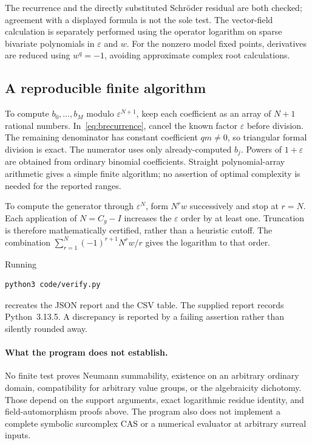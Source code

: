 \documentclass[11pt,a4paper]{article}
\numberwithin{equation}{section}
\theoremstyle{definition}
\theoremstyle{remark}
\newcommand{\eps}{\varepsilon}
\begin{document}
The recurrence and the directly substituted Schr\"oder residual are both
checked; agreement with a displayed formula is not the sole test.  The
vector-field calculation is separately performed using the operator
logarithm on sparse bivariate polynomials in $\eps$ and $w$.
For the nonzero model fixed points, derivatives are reduced using
$w^q=-1$, avoiding approximate complex root calculations.

\subsection{A reproducible finite algorithm}

To compute $b_0,\ldots,b_M$ modulo $\eps^{N+1}$, keep each coefficient as an
array of $N+1$ rational numbers.  In~\eqref{eq:brecurrence}, cancel the known
factor $\eps$ before division.  The remaining denominator has constant
coefficient $qm\ne0$, so triangular formal division is exact.
The numerator uses only already-computed $b_j$.  Powers of $1+\eps$ are
obtained from ordinary binomial coefficients.  Straight polynomial-array
arithmetic gives a simple finite algorithm; no assertion of optimal
complexity is needed for the reported ranges.

To compute the generator through $\eps^N$, form $N^r w$ successively and
stop at $r=N$.  Each application of $N=C_g-I$ increases the $\eps$ order by
at least one.  Truncation is therefore mathematically certified, rather
than a heuristic cutoff.  The combination
$\sum_{r=1}^N(-1)^{r+1}N^r w/r$ gives the logarithm to that order.

Running
\begin{verbatim}
python3 code/verify.py
\end{verbatim}
recreates the JSON report and the CSV table.  The supplied report records
Python~3.13.5.  A discrepancy is reported by a failing assertion rather than
silently rounded away.

\paragraph{What the program does not establish.}
No finite test proves Neumann summability, existence on an arbitrary
ordinary domain, compatibility for arbitrary value groups, or the
algebraicity dichotomy.  Those depend on the support arguments, exact
logarithmic residue identity, and field-automorphism proofs above.
The program also does not implement a complete symbolic surcomplex CAS or
a numerical evaluator at arbitrary surreal inputs.
\end{document}
